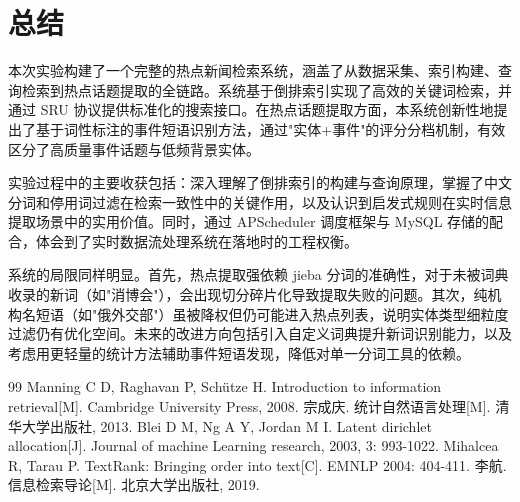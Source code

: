 \documentclass[UTF8,a4paper,zihao=5]{ctexart}
\begin{document}
\section{总结}

本次实验构建了一个完整的热点新闻检索系统，涵盖了从数据采集、索引构建、查询检索到热点话题提取的全链路。系统基于倒排索引实现了高效的关键词检索，并通过 SRU 协议提供标准化的搜索接口。在热点话题提取方面，本系统创新性地提出了基于词性标注的事件短语识别方法，通过"实体+事件"的评分分档机制，有效区分了高质量事件话题与低频背景实体。

实验过程中的主要收获包括：深入理解了倒排索引的构建与查询原理，掌握了中文分词和停用词过滤在检索一致性中的关键作用，以及认识到启发式规则在实时信息提取场景中的实用价值。同时，通过 APScheduler 调度框架与 MySQL 存储的配合，体会到了实时数据流处理系统在落地时的工程权衡。

系统的局限同样明显。首先，热点提取强依赖 jieba 分词的准确性，对于未被词典收录的新词（如"消博会"），会出现切分碎片化导致提取失败的问题。其次，纯机构名短语（如"俄外交部"）虽被降权但仍可能进入热点列表，说明实体类型细粒度过滤仍有优化空间。未来的改进方向包括引入自定义词典提升新词识别能力，以及考虑用更轻量的统计方法辅助事件短语发现，降低对单一分词工具的依赖。

\begin{thebibliography}{99}
 Manning C D, Raghavan P, Schütze H. Introduction to information retrieval[M]. Cambridge University Press, 2008.
 宗成庆. 统计自然语言处理[M]. 清华大学出版社, 2013.
 Blei D M, Ng A Y, Jordan M I. Latent dirichlet allocation[J]. Journal of machine Learning research, 2003, 3: 993-1022.
 Mihalcea R, Tarau P. TextRank: Bringing order into text[C]. EMNLP 2004: 404-411.
 李航. 信息检索导论[M]. 北京大学出版社, 2019.
\end{thebibliography}
\end{document}
